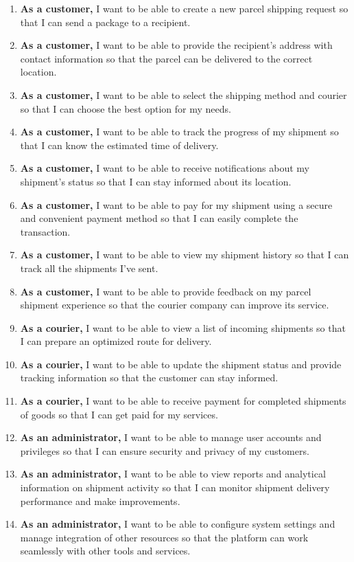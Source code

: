 \begin{enumerate}
    \item \textbf{As a customer,} I want to be able to create a new parcel shipping request so that I can send a package to a recipient.
    \item \textbf{As a customer,} I want to be able to provide the recipient's address with contact information so that the parcel can be delivered to the correct location.
    \item \textbf{As a customer,} I want to be able to select the shipping method and courier so that I can choose the best option for my needs.
    \item \textbf{As a customer,} I want to be able to track the progress of my shipment so that I can know the estimated time of delivery.
    \item \textbf{As a customer,} I want to be able to receive notifications about my shipment's status so that I can stay informed about its location.
    \item \textbf{As a customer,} I want to be able to pay for my shipment using a secure and convenient payment method so that I can easily complete the transaction.
    \item \textbf{As a customer,} I want to be able to view my shipment history so that I can track all the shipments I've sent.
    \item \textbf{As a customer,} I want to be able to provide feedback on my parcel shipment experience so that the courier company can improve its service.
    \item \textbf{As a courier,} I want to be able to view a list of incoming shipments so that I can prepare an optimized route for delivery.
    \item \textbf{As a courier,} I want to be able to update the shipment status and provide tracking information so that the customer can stay informed.
    \item \textbf{As a courier,} I want to be able to receive payment for completed shipments of goods so that I can get paid for my services.
    \item \textbf{As an administrator,} I want to be able to manage user accounts and privileges so that I can ensure security and privacy of my customers.
    \item \textbf{As an administrator,} I want to be able to view reports and analytical information on shipment activity so that I can monitor shipment delivery performance and make improvements.
    \item \textbf{As an administrator,} I want to be able to configure system settings and manage integration of other resources so that the platform can work seamlessly with other tools and services.

\end{enumerate}
